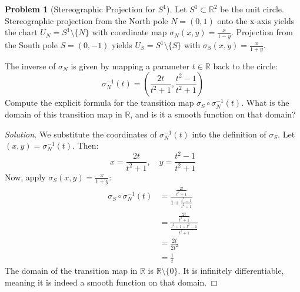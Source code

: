 \documentclass[12pt, a4paper]{article}
\theoremstyle{definition}
\newtheorem{problem}{Problem}
\newenvironment{solution}
  {\renewcommand\qedsymbol{$\blacksquare$}\begin{proof}[Solution]}
  {\end{proof}}
\newcommand{\RR}{\mathbb{R}}
\begin{document}
\begin{problem}[Stereographic Projection for $S^1$]
Let $S^1 \subset \RR^2$ be the unit circle. Stereographic projection from the North pole $N=(0,1)$ onto the x-axis yields the chart $U_N = S^1 \setminus \{N\}$ with coordinate map $\sigma_N(x,y) = \frac{x}{1-y}$. Projection from the South pole $S=(0,-1)$ yields $U_S = S^1 \setminus \{S\}$ with $\sigma_S(x,y) = \frac{x}{1+y}$.

The inverse of $\sigma_N$ is given by mapping a parameter $t \in \RR$ back to the circle:
$$\sigma_N^{-1}(t) = \left( \frac{2t}{t^2+1}, \frac{t^2-1}{t^2+1} \right)$$
Compute the explicit formula for the transition map $\sigma_S \circ \sigma_N^{-1}(t)$. What is the domain of this transition map in $\RR$, and is it a smooth function on that domain?
\end{problem}
\begin{solution}
We substitute the coordinates of $\sigma_N^{-1}(t)$ into the definition of $\sigma_S$. Let $(x,y) = \sigma_N^{-1}(t)$. Then:
\[
x = \frac{2t}{t^2+1}, \quad y = \frac{t^2-1}{t^2+1}
\]
Now, apply $\sigma_S(x,y) = \frac{x}{1+y}$:
\begin{align*}
\sigma_S \circ \sigma_N^{-1}(t) &= \frac{\frac{2t}{t^2+1}}{1 + \frac{t^2-1}{t^2+1}} \\
&= \frac{\frac{2t}{t^2+1}}{\frac{t^2+1 + t^2-1}{t^2+1}} \\
&= \frac{2t}{2t^2} \\
&= \frac{1}{t}
\end{align*}
 The domain of the transition map in $\RR$ is $\RR \setminus \{0\}$.
It is infinitely differentiable, meaning it is indeed a smooth function on that domain.
\end{solution}

\vfill\newpage
\end{document}
